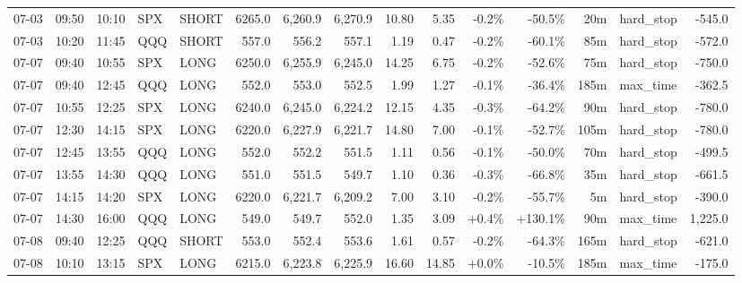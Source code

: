 \documentclass[11pt,a4paper,twoside]{article}
\begin{document}
\begin{landscape}
\begin{center}
\begin{longtable}{>{\color{txtmain}}l l l l l r r r r r r r r >{\color{txtmain}}l r}
07-03 & 09:50 & 10:10 & SPX & SHORT & 6265.0 & 6,260.9 & 6,270.9 & 10.80 & 5.35 & \textcolor{lossred}{-0.2\%} & \textcolor{lossred}{-50.5\%} & 20m & hard\_stop & \textcolor{lossred}{-545.0} \\
07-03 & 10:20 & 11:45 & QQQ & SHORT & 557.0 & 556.2 & 557.1 & 1.19 & 0.47 & \textcolor{lossred}{-0.2\%} & \textcolor{lossred}{-60.1\%} & 85m & hard\_stop & \textcolor{lossred}{-572.0} \\
07-07 & 09:40 & 10:55 & SPX & LONG & 6250.0 & 6,255.9 & 6,245.0 & 14.25 & 6.75 & \textcolor{lossred}{-0.2\%} & \textcolor{lossred}{-52.6\%} & 75m & hard\_stop & \textcolor{lossred}{-750.0} \\
07-07 & 09:40 & 12:45 & QQQ & LONG & 552.0 & 553.0 & 552.5 & 1.99 & 1.27 & \textcolor{lossred}{-0.1\%} & \textcolor{lossred}{-36.4\%} & 185m & max\_time & \textcolor{lossred}{-362.5} \\
07-07 & 10:55 & 12:25 & SPX & LONG & 6240.0 & 6,245.0 & 6,224.2 & 12.15 & 4.35 & \textcolor{lossred}{-0.3\%} & \textcolor{lossred}{-64.2\%} & 90m & hard\_stop & \textcolor{lossred}{-780.0} \\
07-07 & 12:30 & 14:15 & SPX & LONG & 6220.0 & 6,227.9 & 6,221.7 & 14.80 & 7.00 & \textcolor{lossred}{-0.1\%} & \textcolor{lossred}{-52.7\%} & 105m & hard\_stop & \textcolor{lossred}{-780.0} \\
07-07 & 12:45 & 13:55 & QQQ & LONG & 552.0 & 552.2 & 551.5 & 1.11 & 0.56 & \textcolor{lossred}{-0.1\%} & \textcolor{lossred}{-50.0\%} & 70m & hard\_stop & \textcolor{lossred}{-499.5} \\
07-07 & 13:55 & 14:30 & QQQ & LONG & 551.0 & 551.5 & 549.7 & 1.10 & 0.36 & \textcolor{lossred}{-0.3\%} & \textcolor{lossred}{-66.8\%} & 35m & hard\_stop & \textcolor{lossred}{-661.5} \\
07-07 & 14:15 & 14:20 & SPX & LONG & 6220.0 & 6,221.7 & 6,209.2 & 7.00 & 3.10 & \textcolor{lossred}{-0.2\%} & \textcolor{lossred}{-55.7\%} & 5m & hard\_stop & \textcolor{lossred}{-390.0} \\
07-07 & 14:30 & 16:00 & QQQ & LONG & 549.0 & 549.7 & 552.0 & 1.35 & 3.09 & \textcolor{wingreen}{+0.4\%} & \textcolor{wingreen}{+130.1\%} & 90m & max\_time & \textcolor{wingreen}{1,225.0} \\
07-08 & 09:40 & 12:25 & QQQ & SHORT & 553.0 & 552.4 & 553.6 & 1.61 & 0.57 & \textcolor{lossred}{-0.2\%} & \textcolor{lossred}{-64.3\%} & 165m & hard\_stop & \textcolor{lossred}{-621.0} \\
07-08 & 10:10 & 13:15 & SPX & LONG & 6215.0 & 6,223.8 & 6,225.9 & 16.60 & 14.85 & \textcolor{wingreen}{+0.0\%} & \textcolor{lossred}{-10.5\%} & 185m & max\_time & \textcolor{lossred}{-175.0} \\

\end{longtable}
\end{center}
\end{landscape}
\end{document}
